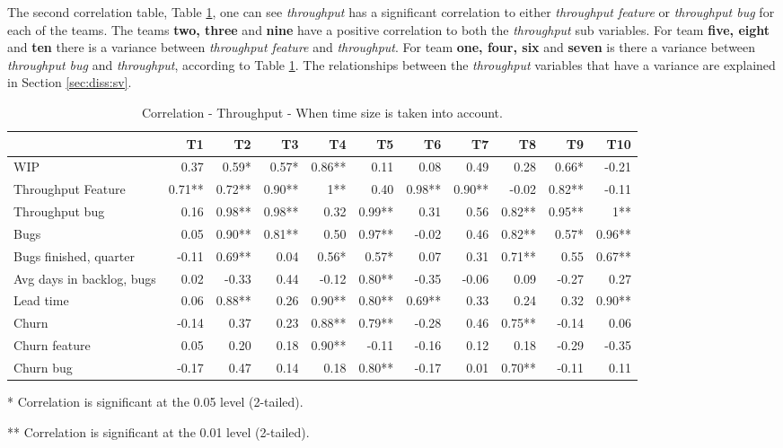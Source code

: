 \documentclass[UKenglish]{ifimaster}  %
\begin{document}
The second correlation table, Table \ref{corr:TP:V2}, one can see \textit{throughput} has a significant correlation to either \textit{throughput feature} or \textit{throughput bug} for each of the teams. The teams \textbf{two, three} and \textbf{nine} have a positive correlation to both the \textit{throughput} sub variables. For team \textbf{five, eight} and \textbf{ten} there is a variance between \textit{throughput feature} and \textit{throughput}.  For team \textbf{one, four, six} and \textbf{seven} is there a variance between \textit{throughput bug} and \textit{throughput}, according to Table \ref{corr:TP:V2}. The relationships between the \textit{throughput} variables that have a variance are explained in Section \ref{sec:diss:sv}.


 \begin{table}[!htbp]
  \begin{adjustwidth}{-2.5cm}{}
 \centering
 \begin{tabular}{|l|r|r|r|r|r|r|r|r|r|r|}
\hline
 & \bf{T1} & \bf{T2} & \bf{T3} & \bf{T4} & \bf{T5} & \bf{T6} & \bf{T7} & \bf{T8} & \bf{T9} & \bf{T10}\\ \hline
 WIP  & 0.37 & 0.59* & 0.57* & 0.86** & 0.11 & 0.08 & 0.49 & 0.28 & 0.66* & -0.21 \\ \hline
 Throughput Feature  & 0.71** & 0.72** & 0.90** & 1** & 0.40 & 0.98** & 0.90** & -0.02 & 0.82** & -0.11 \\ \hline
 Throughput bug  & 0.16 & 0.98** & 0.98** & 0.32 & 0.99** & 0.31 & 0.56 & 0.82** & 0.95** & 1** \\ \hline
 Bugs  & 0.05 & 0.90** & 0.81** & 0.50 & 0.97** & -0.02 & 0.46 & 0.82** & 0.57* & 0.96** \\ \hline
 Bugs finished, quarter  & -0.11 & 0.69** & 0.04 & 0.56* & 0.57* & 0.07 & 0.31 & 0.71** & 0.55 & 0.67** \\ \hline
 Avg days in backlog, bugs  & 0.02 & -0.33 & 0.44 & -0.12 & 0.80** & -0.35 & -0.06 & 0.09 & -0.27 & 0.27 \\ \hline
 Lead time  & 0.06 & 0.88** & 0.26 & 0.90** & 0.80** & 0.69** & 0.33 & 0.24 & 0.32 & 0.90** \\ \hline
 Churn  & -0.14 & 0.37 & 0.23 & 0.88** & 0.79** & -0.28 & 0.46 & 0.75** & -0.14 & 0.06 \\ \hline
 Churn feature  & 0.05 & 0.20 & 0.18 & 0.90** & -0.11 & -0.16 & 0.12 & 0.18 & -0.29 & -0.35 \\ \hline
 Churn bug  & -0.17 & 0.47 & 0.14 & 0.18 & 0.80** & -0.17 & 0.01 & 0.70** & -0.11 & 0.11 \\ \hline
\end{tabular}
 \caption{Correlation - Throughput - When time size is taken into account.}
 \label{corr:TP:V2}
 \centerline {* Correlation is significant at the 0.05 level (2-tailed).}
\centerline{** Correlation is significant at the 0.01 level (2-tailed).}
\end{adjustwidth}
\end{table}
\newpage 
 
\end{document}
